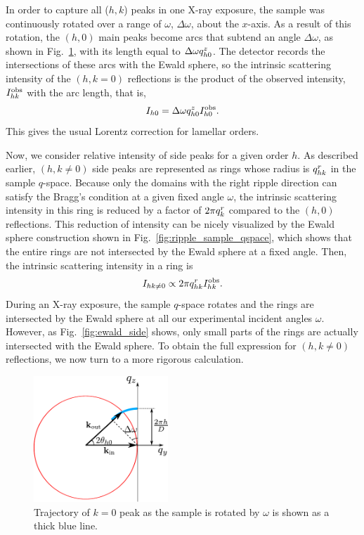 In order to capture all ($h,k$) peaks in one X-ray exposure, 
the sample was continuously rotated over a range of $\omega$, $\Delta\omega$,
about the $x$-axis. As a result of this rotation, 
the $(h,0)$ main peaks become arcs that subtend an angle $\Delta\omega$,
as shown in Fig.~\ref{fig:ewald_main}, with its length
equal to $\Delta\omega q_{h0}^z$. 
The detector records the intersections of these arcs with the 
Ewald sphere, so the intrinsic scattering intensity of the $(h,k=0)$ reflections
is the product of the observed intensity, $I_{hk}^\textrm{obs}$ with the arc length, that is, 
\begin{equation}
  I_{h0} = \Delta\omega q_{h0}^z I_{h0}^\textrm{obs}. \label{eq:main_ewald}
\end{equation}
This gives the usual Lorentz correction for lamellar orders.

Now, we consider relative intensity of side peaks for a given order $h$.
As described earlier, $(h, k\neq 0)$ side peaks are represented as
rings whose radius is $q_{hk}^r$ in the sample $q$-space. 
Because only the domains with the right ripple direction can satisfy the Bragg's condition at a given fixed
angle $\omega$, the intrinsic scattering intensity in this ring is reduced by 
a factor of $2\pi q_{k}^r$ compared to the $(h, 0)$ reflections.
This reduction of intensity can be nicely visualized by the Ewald sphere construction
shown in Fig.~\ref{fig:ripple_sample_qspace},
which shows that the entire rings are not intersected by the Ewald sphere at 
a fixed angle. Then, the intrinsic scattering intensity in a ring is
\begin{equation}
  I_{hk\neq 0} \propto 2\pi q_{hk}^r I_{hk}^\textrm{obs}. \label{eq:side_ewald}
\end{equation}
During an X-ray exposure, the sample $q$-space rotates and 
the rings are intersected by the Ewald sphere at all our experimental incident angles $\omega$.
However, as Fig.~\ref{fig:ewald_side} shows, only small parts of the rings
are actually intersected with the Ewald sphere.  
To obtain the full expression for $(h,k\neq 0)$ reflections, we now turn
to a more rigorous calculation.

\begin{figure}[htbp]
  \centering
  \includegraphics[width=0.45\textwidth]{figures/ripple/analysis/ewald_main}
  \caption{Trajectory of $k=0$ peak as the sample is rotated by $\omega$ is 
  shown as a thick blue line.}
  \label{fig:ewald_main}
\end{figure}

